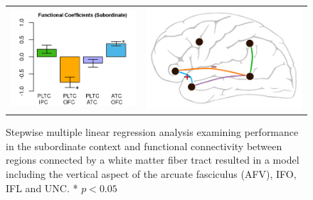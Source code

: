 \documentclass[final,authoryear,5p,times,twocolumn]{elsarticle}
\begin{document}
\begin{figure}[h]
\begin{center}
\begin{tabular}{ c c }
\includegraphics[width=0.45\linewidth]{figures/FC_Subordinate2.png} &
\includegraphics[width=0.45\linewidth]{figures/func_diag2.png} 
\end{tabular}
\caption{Stepwise multiple linear regression analysis examining performance in the subordinate context and functional connectivity between regions connected by a white matter fiber tract resulted in a model including the vertical aspect of the arcuate fasciculus (AFV), IFO, IFL and UNC. * $p<0.05$}
\label{fig:mlr_fc}
\end{center}
\end{figure}
\end{document}
